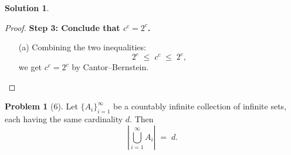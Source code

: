 \documentclass[12pt]{article}
\theoremstyle{definition} %
\newtheorem{solution}{Solution}
\newtheorem{problem}{Problem}
\theoremstyle{plain} %
\begin{document}
\begin{solution}
\begin{proof}
        \textbf{Step 3: Conclude that $c^c = 2^c$.}
        \begin{enumerate}
            \item[(a)] Combining the two inequalities:
            \[
               2^c \;\le\; c^c \;\le\; 2^c,
            \]
            we get $c^c = 2^c$ by Cantor--Bernstein.
        \end{enumerate}
        \end{proof}
    \end{solution}

\begin{problem}[6]
    \label{thm:countable_union_same_card}
    Let $\{A_i\}_{i=1}^\infty$ be a countably infinite collection of infinite sets, each having the same cardinality $d$. Then
    \[
       \left|\bigcup_{i=1}^\infty A_i\right| \;=\; d.
    \]
\end{problem}
\end{document}
